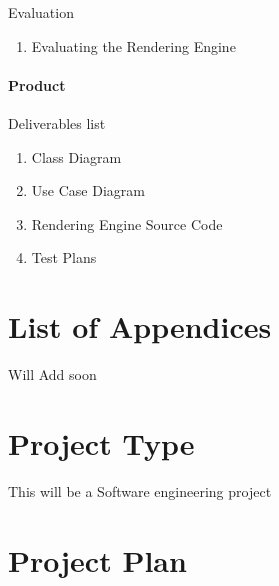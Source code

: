 Evaluation
\begin{enumerate}
    \item Evaluating the Rendering Engine
\end{enumerate}


\paragraph{Product}
Deliverables list
\begin{enumerate}
    \item Class Diagram
    \item Use Case Diagram
    \item Rendering Engine Source Code 
    \item Test Plans
\end{enumerate}

\section{List of Appendices}
Will Add soon

\section{Project Type}
This will be a Software engineering project
\section{Project Plan}
\noindent
{}
{}

